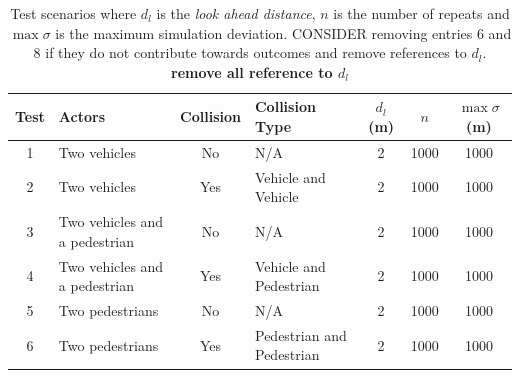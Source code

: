 \documentclass[letterpaper, 10 pt, journal, twoside]{IEEEtran}
\begin{document}
\begin{table}[b]
\centering
\begin{tabular}{clclccc}
\toprule
Test 		& Actors 						 & Collision & Collision Type 			 & $d_l$ (m) & $n$  &$\max\sigma$ (m) \\ \midrule
1       & Two vehicles                   & No  		 & N/A 			  			 & 2 		 & 1000 & 1000 \\
2       & Two vehicles                   & Yes 		 & Vehicle and Vehicle 		 & 2 		 & 1000 & 1000 \\
3       & Two vehicles and a pedestrian  & No  		 & N/A 			  			 & 2 		 & 1000 & 1000 \\
4       & Two vehicles and a pedestrian  & Yes 		 & Vehicle and Pedestrian 	 & 2 		 & 1000 & 1000 \\
5       & Two pedestrians                & No  		 & N/A 			  			 & 2 		 & 1000 & 1000 \\
6       & Two pedestrians                & Yes 		 & Pedestrian and Pedestrian & 2 		 & 1000 & 1000 \\
\bottomrule
\end{tabular}
\caption{Test scenarios where $d_l$ is the \textit{look ahead distance}, $n$ is the number of repeats and $\max\sigma$ is the maximum simulation deviation. CONSIDER removing entries 6 and 8 if they do not contribute towards outcomes and remove references to $d_l$. \textbf{remove all reference to $d_l$}}
\label{TableOfExperiments}
\end{table}

\end{document}
